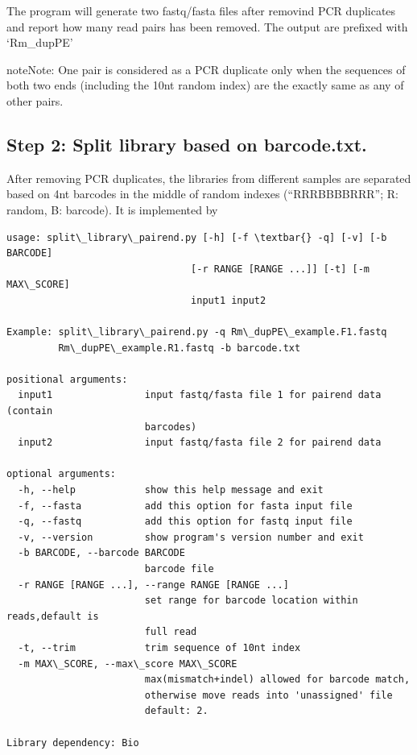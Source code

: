 \documentclass[letterpaper,10pt,english]{sphinxmanual}
\begin{document}
The program will generate two fastq/fasta files after removind PCR duplicates and report how many read pairs has been removed. The output are prefixed with `Rm\_dupPE'

\begin{notice}{note}{Note:}
One pair is considered as a PCR duplicate only when the sequences of both two ends (including the 10nt random index) are the exactly same as any of other pairs.
\end{notice}


\subsection{Step 2: Split library based on barcode.txt.}
\label{Analysis_pipeline:step-2-split-library-based-on-barcode-txt}\label{Analysis_pipeline:step2}
After removing PCR duplicates, the libraries from different samples are separated based on 4nt barcodes in the middle of random indexes (``RRRBBBBRRR''; R: random, B: barcode). It is implemented by 

\begin{Verbatim}[commandchars=\\\{\}]
usage: split\_library\_pairend.py [-h] [-f \textbar{} -q] [-v] [-b BARCODE]
                                [-r RANGE [RANGE ...]] [-t] [-m MAX\_SCORE]
                                input1 input2

Example: split\_library\_pairend.py -q Rm\_dupPE\_example.F1.fastq
         Rm\_dupPE\_example.R1.fastq -b barcode.txt

positional arguments:
  input1                input fastq/fasta file 1 for pairend data (contain
                        barcodes)
  input2                input fastq/fasta file 2 for pairend data

optional arguments:
  -h, --help            show this help message and exit
  -f, --fasta           add this option for fasta input file
  -q, --fastq           add this option for fastq input file
  -v, --version         show program's version number and exit
  -b BARCODE, --barcode BARCODE
                        barcode file
  -r RANGE [RANGE ...], --range RANGE [RANGE ...]
                        set range for barcode location within reads,default is
                        full read
  -t, --trim            trim sequence of 10nt index
  -m MAX\_SCORE, --max\_score MAX\_SCORE
                        max(mismatch+indel) allowed for barcode match,
                        otherwise move reads into 'unassigned' file
                        default: 2.

Library dependency: Bio
\end{Verbatim}
\end{document}
